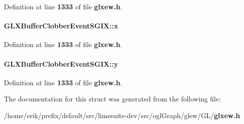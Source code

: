 Definition at line {\bf 1333} of file {\bf glxew.\+h}.

\paragraph[{x}]{ G\+L\+X\+Buffer\+Clobber\+Event\+S\+G\+I\+X\+::x}\label{structGLXBufferClobberEventSGIX_a5118d48c3c8d5253d39922b5014b52ff}


Definition at line {\bf 1333} of file {\bf glxew.\+h}.

\paragraph[{y}]{ G\+L\+X\+Buffer\+Clobber\+Event\+S\+G\+I\+X\+::y}\label{structGLXBufferClobberEventSGIX_aef21efa11558a5b67861f96471c56003}


Definition at line {\bf 1333} of file {\bf glxew.\+h}.



The documentation for this struct was generated from the following file\+:\begin{DoxyCompactItemize}
\item 
/home/erik/prefix/default/src/limesuite-\/dev/src/ogl\+Graph/glew/\+G\+L/{\bf glxew.\+h}\end{DoxyCompactItemize}
